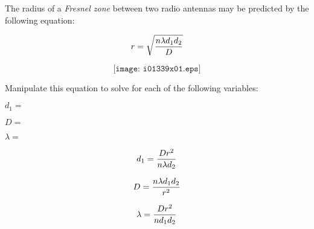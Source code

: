 

The radius of a {\it Fresnel zone} between two radio antennas may be predicted by the following equation:

$$r = \sqrt{{n \lambda d_1 d_2} \over D}$$

$$\texttt{[image: i01339x01.eps]}$$

Manipulate this equation to solve for each of the following variables:

\vskip 10pt

$d_1 =$

\vskip 10pt

$D =$

\vskip 10pt

$\lambda =$

\vskip 10pt







$$d_1 = {D r^2 \over n \lambda d_2}$$

\vskip 20pt

$$D = {n \lambda d_1 d_2 \over r^2}$$

\vskip 20pt

$$\lambda = {D r^2 \over n d_1 d_2}$$












